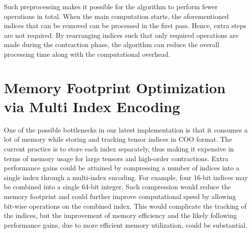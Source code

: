 \noindent
Such preprocessing makes it possible for the algorithm to perform fewer operations in total.
When the main computation starts, the aforementioned indices that can be removed can be
processed in the first pass. Hence, extra steps are not required. By rearranging indices
such that only required operations are made during the contraction phase, the algorithm can
reduce the overall processing time along with the computational overhead.

\section{Memory Footprint Optimization via Multi Index Encoding}
One of the possible bottlenecks in our latest implementation is that it consumes a lot of
memory while storing and tracking tensor indices in COO format. The current practice is to
store each index separately, thus making it expensive in terms of memory usage for large
tensors and high-order contractions. Extra performance gains could be attained by compressing
a number of indices into a single index through a multi-index encoding. For example, four
16-bit indices may be combined into a single 64-bit integer. Such compression would reduce
the memory footprint and could further improve computational speed by allowing bit-wise
operations on the combined index. This would complicate the tracking of the indices, but the
improvement of memory efficiency and the likely following performance gains, due to more efficient
memory utilization, could be substantial.